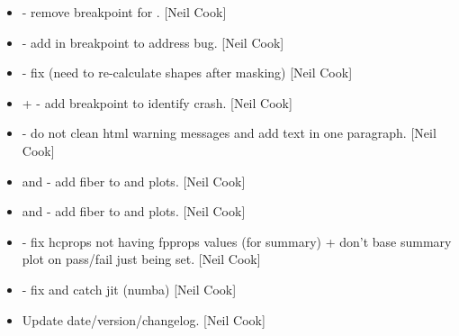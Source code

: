 \documentclass[a4paper,10pt,english]{report}
\begin{document}
\begin{itemize}
\item {} 
 - remove breakpoint for . {[}Neil Cook{]}

\item {} 
 - add in breakpoint to address bug. {[}Neil
Cook{]}

\item {} 
 - fix  (need to re-calculate
shapes after masking) {[}Neil Cook{]}

\item {} 
 +  -
add breakpoint to identify crash. {[}Neil Cook{]}

\item {} 
 - do not clean html warning messages and add text in
one paragraph. {[}Neil Cook{]}

\item {} 
 and  - add fiber to
 and  plots. {[}Neil Cook{]}

\item {} 
 and  - add fiber to
 and  plots. {[}Neil Cook{]}

\item {} 
 - fix hcprops not having fpprops values (for
summary) + don’t base summary plot on pass/fail just 
being set. {[}Neil Cook{]}

\item {} 
 - fix and catch jit (numba) {[}Neil Cook{]}

\item {} 
Update date/version/changelog. {[}Neil Cook{]}

\end{itemize}
\end{document}
